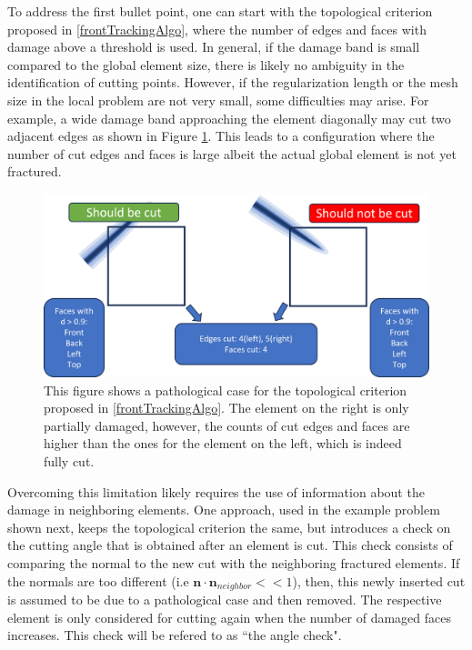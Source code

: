 To address the first bullet point, one can start with the topological criterion proposed in \ref{frontTrackingAlgo}, where the number of edges and faces with damage above a threshold is used. In general, if the damage band is small compared to the global element size, there is likely no ambiguity in the identification of cutting points. However, if the regularization length or the mesh size in the local problem are not very small, some difficulties may arise. For example, a wide damage band approaching the element diagonally may cut two adjacent edges as shown in Figure \ref{fig:pathological_case}. This leads to a configuration where the number of cut edges and faces is large albeit the actual global element is not yet fractured. 

\begin{figure}
    \centering
    \includegraphics[width=\linewidth]{Chapter4/figures/nonplanar/pathology.png}
    \caption{This figure shows a pathological case for the topological criterion proposed in \ref{frontTrackingAlgo}. The element on the right is only partially damaged, however, the counts of cut edges and faces are higher than the ones for the element on the left, which is indeed fully cut.}
    \label{fig:pathological_case}
\end{figure}%

Overcoming this limitation likely requires the use of information about the damage in neighboring elements. One approach, used in the example problem shown next, keeps the topological criterion the same, but introduces a check on the cutting angle that is obtained after an element is cut. This check consists of comparing the normal to the new cut with the neighboring fractured elements. If the normals are too different (i.e $\textbf{n}\cdot\textbf{n}_{neighbor} << 1$), then, this newly inserted cut is assumed to be due to a pathological case and then removed. The respective element is only considered for cutting again when the number of damaged faces increases. This check will be refered to as ``the angle check".

